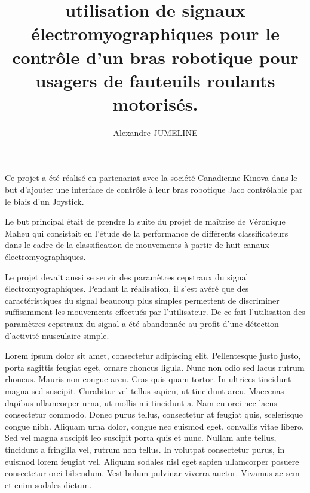 \documentclass[letterpaper, twoside, 12pt, memoire, creativecommons, hyperref]{thETS}
\title{utilisation de signaux électromyographiques pour le contrôle d'un bras robotique pour usagers de fauteuils roulants motorisés.}
\author{Alexandre JUMELINE}
\begin{document}

\maketitle

\presentjury

\begin{avantpropos}
Ce projet a été réalisé en partenariat avec la société Canadienne Kinova dans le but d'ajouter une interface de contrôle à leur bras robotique Jaco contrôlable par le biais d'un Joystick. 

Le but principal était de prendre la suite du projet de maîtrise de Véronique Maheu qui consistait en l'étude de la performance de différents classificateurs dans le cadre de la classification de mouvements à partir de huit canaux électromyographiques. 

Le projet devait aussi se servir des paramètres cepstraux du signal électromyographiques. Pendant la réalisation, il s'est avéré que des caractéristiques du signal beaucoup plus simples permettent de discriminer suffisamment les mouvements effectués par l'utilisateur. De ce fait l'utilisation des paramètres cepstraux du signal a été abandonnée au profit d'une détection d'activité musculaire simple.
\end{avantpropos}

\begin{remerciements}
Lorem ipsum dolor sit amet, consectetur adipiscing elit. Pellentesque justo justo, porta sagittis feugiat eget, ornare rhoncus ligula. Nunc non odio sed lacus rutrum rhoncus. Mauris non congue arcu. Cras quis quam tortor. In ultrices tincidunt magna sed suscipit. Curabitur vel tellus sapien, ut tincidunt arcu. Maecenas dapibus ullamcorper urna, ut mollis mi tincidunt a. Nam eu orci nec lacus consectetur commodo. Donec purus tellus, consectetur at feugiat quis, scelerisque congue nibh. Aliquam urna dolor, congue nec euismod eget, convallis vitae libero. Sed vel magna suscipit leo suscipit porta quis et nunc. Nullam ante tellus, tincidunt a fringilla vel, rutrum non tellus. In volutpat consectetur purus, in euismod lorem feugiat vel. Aliquam sodales nisl eget sapien ullamcorper posuere consectetur orci bibendum. Vestibulum pulvinar viverra auctor. Vivamus ac sem et enim sodales dictum.
\end{remerciements}
\end{document}
